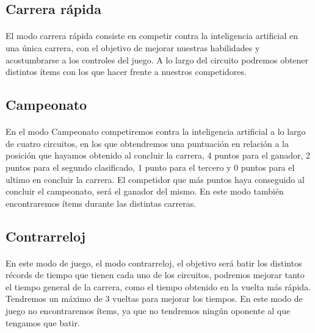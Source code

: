 \subsection{Carrera rápida}

\paragraph{}
El modo carrera rápida consiste en competir contra la inteligencia artificial en una única carrera, con el objetivo de 
mejorar nuestras habilidades y acostumbrarse a los controles del juego. A lo largo del circuito podremos obtener distintos
ítems con los que hacer frente a nuestros competidores.

\subsection{Campeonato}

\paragraph{}
En el modo Campeonato competiremos contra la inteligencia artificial a lo largo de cuatro circuitos, en los que obtendremos
una puntuación en relación a la posición que hayamos obtenido al concluir la carrera, 4 puntos para el ganador, 2 puntos para
el segundo clasificado, 1 punto para el tercero y 0 puntos para el ultimo en concluir la carrera. El competidor que más puntos haya 
conseguido al concluir el campeonato, será el ganador del mismo. En este modo
también encontraremos ítems durante las distintas carreras.

\subsection{Contrarreloj}

\paragraph{}
En este modo de juego, el modo contrarreloj, el objetivo será batir los
distintos récords de tiempo que tienen cada uno de los 
circuitos, podremos mejorar tanto el tiempo general de la carrera, como el tiempo obtenido en la vuelta más rápida. Tendremos
un máximo de 3 vueltas para mejorar los tiempos. En este modo de juego no
encontraremos ítems, ya que no tendremos ningún oponente
al que tengamos que batir.


